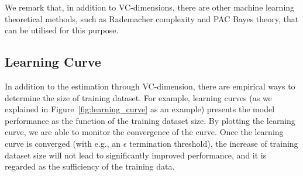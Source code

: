 We remark that, in addition to VC-dimensions, there are other machine learning theoretical methods, such as Rademacher complexity and PAC Bayes theory, that can be utilised for this purpose. 

\subsection*{Learning Curve}

In addition to the estimation through VC-dimension, there are empirical ways to determine the size of training dataset. For example, learning curves (as we explained in Figure~\ref{fig:learning_curve} as an example) presents the model performance as the function of the training dataset size. By plotting the learning curve, we are able to 
monitor the convergence of the curve. Once the learning curve is converged (with e.g., an $\epsilon$ termination threshold), the increase of training dataset size will not lead to significantly improved performance, and it is regarded as the sufficiency of the training data. 



